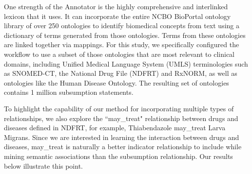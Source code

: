 One strength of the Annotator is the highly comprehensive and interlinked lexicon that it uses. It can incorporate the entire NCBO BioPortal ontology library of over 250 ontologies to identify biomedical concepts from text using a dictionary of terms generated from those ontologies. Terms from these ontologies are linked together via mappings. For this study, we specifically configured the workflow to use a subset of those ontologies that are most relevant to clinical domains, including Unified Medical Language System (UMLS) terminologies such as SNOMED-CT, the National Drug File (NDFRT) and RxNORM, as well as ontologies like the Human Disease Ontology. The resulting set of ontologies contains 1 million subsumption statements.

To highlight the capability of our method for incorporating multiple types of relationships, we also explore the ``may\_treat" relationship between drugs and diseases defined in NDFRT, for example, Thiabendazole may\_treat Larva Migrans. Since we are interested in learning the interaction between drugs and diseases, may\_treat is naturally a better indicator relationship to include while mining semantic associations than the subsumption relationship. Our results below illustrate this point.


